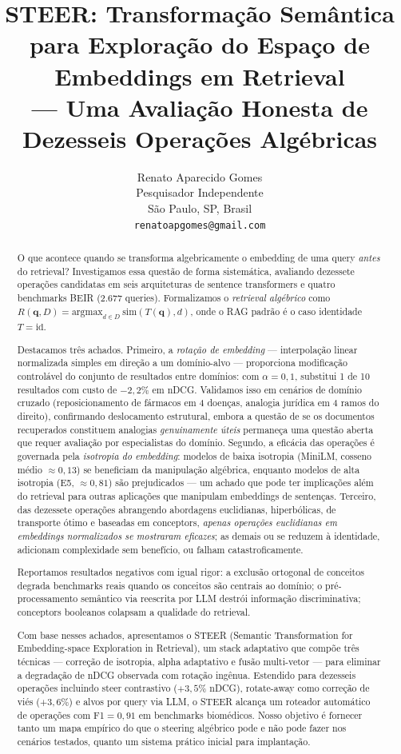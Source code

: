 \documentclass{article}
\title{STEER: Transformação Semântica para Exploração do Espaço de Embeddings em Retrieval\\--- Uma Avaliação Honesta de Dezesseis Operações Algébricas}
\author{Renato Aparecido Gomes \\
Pesquisador Independente \\
S\~{a}o Paulo, SP, Brasil \\
\texttt{renatoapgomes@gmail.com}}
\date{}
\begin{document}
\maketitle

\begin{abstract}
O que acontece quando se transforma algebricamente o embedding de uma query \emph{antes} do retrieval? Investigamos essa questão de forma sistemática, avaliando dezessete operações candidatas em seis arquiteturas de sentence transformers e quatro benchmarks BEIR (2.677 queries). Formalizamos o \emph{retrieval algébrico} como $R(\mathbf{q}, D) = \text{argmax}_{d \in D} \ \text{sim}(T(\mathbf{q}), d)$, onde o RAG padrão é o caso identidade $T = \text{id}$.

Destacamos três achados. Primeiro, a \emph{rotação de embedding} --- interpolação linear normalizada simples em direção a um domínio-alvo --- proporciona modificação controlável do conjunto de resultados entre domínios: com $\alpha = 0{,}1$, substitui 1 de 10 resultados com custo de $-2{,}2\%$ em nDCG. Validamos isso em cenários de domínio cruzado (reposicionamento de fármacos em 4 doenças, analogia jurídica em 4 ramos do direito), confirmando deslocamento estrutural, embora a questão de se os documentos recuperados constituem analogias \emph{genuinamente úteis} permaneça uma questão aberta que requer avaliação por especialistas do domínio. Segundo, a eficácia das operações é governada pela \emph{isotropia do embedding}: modelos de baixa isotropia (MiniLM, cosseno médio $\approx 0{,}13$) se beneficiam da manipulação algébrica, enquanto modelos de alta isotropia (E5, $\approx 0{,}81$) são prejudicados --- um achado que pode ter implicações além do retrieval para outras aplicações que manipulam embeddings de sentenças. Terceiro, das dezessete operações abrangendo abordagens euclidianas, hiperbólicas, de transporte ótimo e baseadas em conceptors, \emph{apenas operações euclidianas em embeddings normalizados se mostraram eficazes}; as demais ou se reduzem à identidade, adicionam complexidade sem benefício, ou falham catastroficamente.

Reportamos resultados negativos com igual rigor: a exclusão ortogonal de conceitos degrada benchmarks reais quando os conceitos são centrais ao domínio; o pré-processamento semântico via reescrita por LLM destrói informação discriminativa; conceptors booleanos colapsam a qualidade do retrieval.

Com base nesses achados, apresentamos o STEER (Semantic Transformation for Embedding-space Exploration in Retrieval), um stack adaptativo que compõe três técnicas --- correção de isotropia, alpha adaptativo e fusão multi-vetor --- para eliminar a degradação de nDCG observada com rotação ingênua. Estendido para dezesseis operações incluindo steer contrastivo ($+3{,}5\%$ nDCG), rotate-away como correção de viés ($+3{,}6\%$) e alvos por query via LLM, o STEER alcança um roteador automático de operações com F1$=0{,}91$ em benchmarks biomédicos. Nosso objetivo é fornecer tanto um mapa empírico do que o steering algébrico pode e não pode fazer nos cenários testados, quanto um sistema prático inicial para implantação.
\end{abstract}
\end{document}
